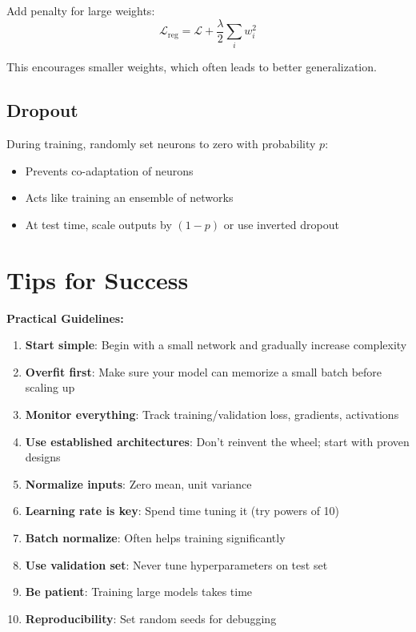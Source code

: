 Add penalty for large weights:
\[
\mathcal{L}_{\text{reg}} = \mathcal{L} + \frac{\lambda}{2} \sum_i w_i^2
\]

This encourages smaller weights, which often leads to better generalization.

\subsection{Dropout}

During training, randomly set neurons to zero with probability $p$:
\begin{itemize}
    \item Prevents co-adaptation of neurons
    \item Acts like training an ensemble of networks
    \item At test time, scale outputs by $(1-p)$ or use inverted dropout
\end{itemize}

\section{Tips for Success}

\begin{summary}
\textbf{Practical Guidelines:}

\begin{enumerate}
    \item \textbf{Start simple}: Begin with a small network and gradually increase complexity
    
    \item \textbf{Overfit first}: Make sure your model can memorize a small batch before scaling up
    
    \item \textbf{Monitor everything}: Track training/validation loss, gradients, activations
    
    \item \textbf{Use established architectures}: Don't reinvent the wheel; start with proven designs
    
    \item \textbf{Normalize inputs}: Zero mean, unit variance
    
    \item \textbf{Learning rate is key}: Spend time tuning it (try powers of 10)
    
    \item \textbf{Batch normalize}: Often helps training significantly
    
    \item \textbf{Use validation set}: Never tune hyperparameters on test set
    
    \item \textbf{Be patient}: Training large models takes time
    
    \item \textbf{Reproducibility}: Set random seeds for debugging
\end{enumerate}
\end{summary}

